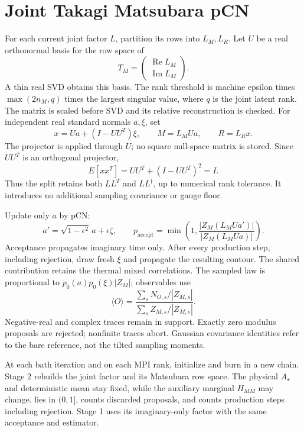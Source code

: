 \documentclass[11pt,a4paper]{article}
\newcommand{\code}[1]{\path{#1}}
\begin{document}
\section{Joint Takagi Matsubara pCN}
For each current joint factor \(L\), partition its rows into \(L_M,L_R\). Let
\(U\) be a real orthonormal basis for the row space of
\[
 T_M=\begin{pmatrix}\operatorname{Re}L_M\\\operatorname{Im}L_M\end{pmatrix}.
\]
A thin real SVD obtains this basis. The rank threshold is machine epsilon times
\(\max(2n_M,q)\) times the largest singular value, where \(q\) is the joint latent
rank. The matrix is scaled before SVD and its relative reconstruction is checked.
For independent real standard normals \(a,\xi\), set
\[
 x=Ua+(I-UU^T)\xi,\qquad M=L_MUa,\qquad R=L_Rx.
\]
The projector is applied through \(U\); no square null-space matrix is stored.
Since \(UU^T\) is an orthogonal projector,
\[
 E[xx^T]=UU^T+(I-UU^T)^2=I.
\]
Thus the split retains both \(LL^T\) and \(LL^\dagger\), up to numerical rank
tolerance. It introduces no additional sampling covariance or gauge floor.

Update only \(a\) by pCN:
\[
 a'=\sqrt{1-\epsilon^2}\,a+\epsilon\zeta,\qquad
 p_{\mathrm{accept}}=\min\left(1,\frac{|Z_M(L_MUa')|}{|Z_M(L_MUa)|}\right).
\]
Acceptance propagates imaginary time only. After every production step,
including rejection, draw fresh \(\xi\) and propagate the resulting contour.
The shared contribution retains the thermal mixed correlations. The sampled law
is proportional to \(p_0(a)p_0(\xi)|Z_M|\); observables use
\[
 \langle O\rangle=\frac{\sum_s N_{O,s}/|Z_{M,s}|}
                           {\sum_s Z_{M,s}/|Z_{M,s}|}.
\]
Negative-real and complex traces remain in support. Exactly zero modulus
proposals are rejected; nonfinite traces abort. Gaussian covariance identities
refer to the bare reference, not the tilted sampling moments.

At each bath iteration and on each MPI rank, initialize and burn in a new chain.
Stage 2 rebuilds the joint factor and its Matsubara row space. The physical
\(A_\star\) and deterministic mean stay fixed, while the auxiliary marginal
\(H_{MM}\) may change. \code{mhStepSize} lies in \((0,1]\),
\code{mhBurnIn} counts discarded proposals, and \code{numSamplesPerCore} counts
production steps including rejection. Stage 1 uses its imaginary-only factor
with the same acceptance and estimator.
\end{document}

